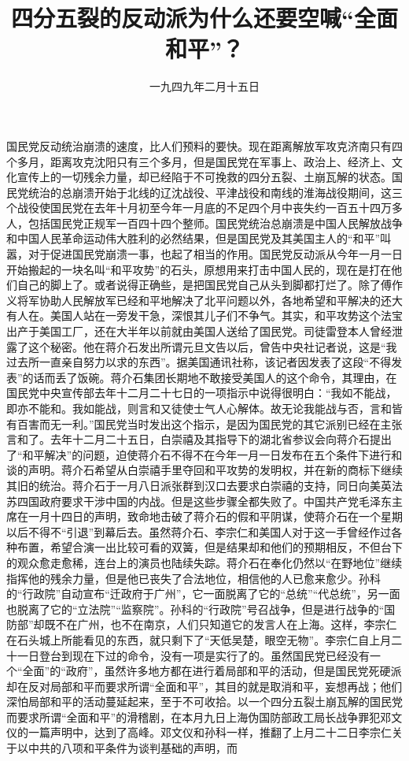 
\title{四分五裂的反动派为什么还要空喊“全面和平”？}
\date{一九四九年二月十五日}
\maketitle


国民党反动统治崩溃的速度，比人们预料的要快。现在距离解放军攻克济南只有四个多月，距离攻克沈阳只有三个多月，但是国民党在军事上、政治上、经济上、文化宣传上的一切残余力量，却已经陷于不可挽救的四分五裂、土崩瓦解的状态。国民党统治的总崩溃开始于北线的辽沈战役、平津战役和南线的淮海战役期间，这三个战役使国民党在去年十月初至今年一月底的不足四个月中丧失约一百五十四万多人，包括国民党正规军一百四十四个整师。国民党统治总崩溃是中国人民解放战争和中国人民革命运动伟大胜利的必然结果，但是国民党及其美国主人的“和平”叫嚣，对于促进国民党崩溃一事，也起了相当的作用。国民党反动派从今年一月一日开始搬起的一块名叫“和平攻势”的石头，原想用来打击中国人民的，现在是打在他们自己的脚上了。或者说得正确些，是把国民党自己从头到脚都打烂了。除了傅作义将军协助人民解放军已经和平地解决了北平问题以外，各地希望和平解决的还大有人在。美国人站在一旁发干急，深恨其儿子们不争气。其实，和平攻势这个法宝出产于美国工厂，还在大半年以前就由美国人送给了国民党。司徒雷登本人曾经泄露了这个秘密。他在蒋介石发出所谓元旦文告以后，曾告中央社记者说，这是“我过去所一直亲自努力以求的东西”。据美国通讯社称，该记者因发表了这段“不得发表”的话而丢了饭碗。蒋介石集团长期地不敢接受美国人的这个命令，其理由，在国民党中央宣传部去年十二月二十七日的一项指示中说得很明白：“我如不能战，即亦不能和。我如能战，则言和又徒使士气人心解体。故无论我能战与否，言和皆有百害而无一利。”国民党当时发出这个指示，是因为国民党的其它派别已经在主张言和了。去年十二月二十五日，白崇禧及其指导下的湖北省参议会向蒋介石提出了“和平解决”的问题，迫使蒋介石不得不在今年一月一日发布在五个条件下进行和谈的声明。蒋介石希望从白崇禧手里夺回和平攻势的发明权，并在新的商标下继续其旧的统治。蒋介石于一月八日派张群到汉口去要求白崇禧的支持，同日向美英法苏四国政府要求干涉中国的内战。但是这些步骤全都失败了。中国共产党毛泽东主席在一月十四日的声明，致命地击破了蒋介石的假和平阴谋，使蒋介石在一个星期以后不得不“引退”到幕后去。虽然蒋介石、李宗仁和美国人对于这一手曾经作过各种布置，希望合演一出比较可看的双簧，但是结果却和他们的预期相反，不但台下的观众愈走愈稀，连台上的演员也陆续失踪。蒋介石在奉化仍然以“在野地位”继续指挥他的残余力量，但是他已丧失了合法地位，相信他的人已愈来愈少。孙科的“行政院”自动宣布“迁政府于广州”，它一面脱离了它的“总统”“代总统”，另一面也脱离了它的“立法院”“监察院”。孙科的“行政院”号召战争，但是进行战争的“国防部”却既不在广州，也不在南京，人们只知道它的发言人在上海。这样，李宗仁在石头城上所能看见的东西，就只剩下了“天低吴楚，眼空无物”。李宗仁自上月二十一日登台到现在下过的命令，没有一项是实行了的。虽然国民党已经没有一个“全面”的“政府”，虽然许多地方都在进行着局部和平的活动，但是国民党死硬派却在反对局部和平而要求所谓“全面和平”，其目的就是取消和平，妄想再战；他们深怕局部和平的活动蔓延起来，至于不可收拾。以一个四分五裂土崩瓦解的国民党而要求所谓“全面和平”的滑稽剧，在本月九日上海伪国防部政工局长战争罪犯邓文仪的一篇声明中，达到了高峰。邓文仪和孙科一样，推翻了上月二十二日李宗仁关于以中共的八项和平条件为谈判基础的声明，而